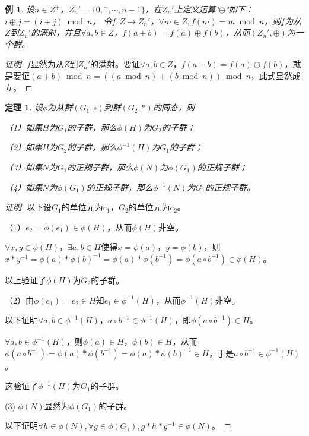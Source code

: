 \documentclass{article}
\newtheorem{Thm}{定理}
\newtheorem*{Example}{例}
\begin{document}
\begin{CJK*}{UTF8}{gbsn}
  \begin{Example}
    设$n\in Z^+$，$Z_n'=\{0,1,\cdots, n-1\}$，在$Z_n'$上定义运算"$\oplus$"如下：$i\oplus j=(i+j)\bmod n$，
    令$f:Z\to Z_n'$，$\forall m\in Z, f(m)= m \bmod n$，则$f$为从$Z$到$Z_n'$的满射，并且$\forall a,b\in Z$，$f(a+b)=f(a)\oplus f(b)$，从而$(Z_n',\oplus)$为一个群。
  \end{Example}
  \begin{proof}[证明]
    $f$显然为从$Z$到$Z_n'$的满射。要证$\forall a,b\in Z$，$f(a+b)=f(a)\oplus f(b)$，就是要证$(a+b)\bmod n = ((a\bmod n) + (b\bmod n))\bmod n$，此式显然成立。
  \end{proof}
  \begin{Thm}
    设$\phi$为从群$(G_1,\circ)$到群$(G_2,*)$的同态，则
  
    （1）如果$H$为$G_1$的子群，那么$\phi(H)$为$G_2$的子群；
  
    （2）如果$H$为$G_2$的子群，那么$\phi^{-1}(H)$为$G_1$的子群；
  
    （3）如果$N$为$G_1$的正规子群，那么$\phi(N)$为$\phi(G_1)$的正规子群；
  
    （4）如果$N$为$\phi(G_1)$的正规子群，那么$\phi^{-1}(N)$为$G_1$的正规子群。
  \end{Thm}
  \begin{proof}[证明]
    以下设$G_1$的单位元为$e_1$，$G_2$的单位元为$e_2$。
  
    （1）$e_2=\phi(e_1)\in \phi(H)$，从而$\phi(H)$非空。
  
    $\forall x, y\in \phi(H)$，$\exists a,b\in H$使得$x=\phi(a)$，$y=\phi(b)$，则$x*y^{-1}=\phi(a)*\phi(b)^{-1}=\phi(a)*\phi(b^{-1})=\phi(a\circ b^{-1})\in \phi(H)$。
  
    以上验证了$\phi(H)$为$G_2$的子群。
  
    （2）由$\phi(e_1)=e_2\in H$知$e_1\in \phi^{-1}(H)$，从而$\phi^{-1}(H)$非空。
  
    以下证明$\forall a,b\in \phi^{-1}(H)$，$a\circ b^{-1}\in \phi^{-1}(H)$，即$\phi(a\circ b^{-1})\in H$。
    
    $\forall a,b\in \phi^{-1}(H)$，则$\phi(a)\in H$，$\phi(b)\in H$，从而$\phi(a\circ b^{-1})=\phi(a)*\phi(b^{-1})=\phi(a)*\phi(b)^{-1}\in H$，于是$a\circ b^{-1}\in \phi^{-1}(H)$。
  
    这验证了$\phi^{-1}(H)$为$G_1$的子群。
  
    (3) $\phi(N)$显然为$\phi(G_1)$的子群。
  
    以下证明$\forall h\in \phi(N), \forall g\in \phi(G_1), g*h*g^{-1}\in \phi(N)$。
  

\end{proof}
\end{CJK*}
\end{document}
